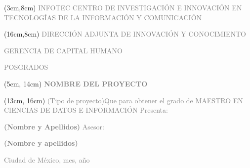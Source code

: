 \newpage{\ }
\thispagestyle{empty}

\begin{titlepage}

\begin{textblock*}{9.5cm}(3cm,8cm) %
	\renewcommand{\baselinestretch}{1}
   \flushright\normalsize\textcolor{gray}{INFOTEC CENTRO DE INVESTIGACIÓN E INNOVACIÓN EN TECNOLOGÍAS DE LA INFORMACIÓN Y COMUNICACIÓN}
\end{textblock*}

\begin{textblock*}{8cm}(16cm,8cm) %
	\renewcommand{\baselinestretch}{1}
	\flushleft\footnotesize\textcolor{gray}{DIRECCIÓN ADJUNTA DE INNOVACIÓN Y CONOCIMIENTO}\par
	\textcolor{gray}{GERENCIA DE CAPITAL HUMANO} \par
	\textcolor{gray}{POSGRADOS}
\end{textblock*}

\begin{textblock*}{8cm}(5cm, 14cm)
	\renewcommand{\baselinestretch}{1}
	\center\Huge\textcolor{gray}{\textbf{NOMBRE DEL PROYECTO}}
\end{textblock*}

\begin{textblock*}{10cm}(13cm, 16cm)
	\renewcommand{\baselinestretch}{1}
	\flushleft\normalsize\textcolor{gray}{(Tipo de proyecto)\newline Que para obtener el grado de MAESTRO EN CIENCIAS DE DATOS E INFORMACIÓN}
	\vspace{2em}
	\flushleft\normalsize\textcolor{gray}{Presenta:}\par
	\flushleft\normalsize\textcolor{gray}{\textbf{(Nombre y Apellidos)}}
	\flushleft\normalsize\textcolor{gray}{Asesor:}\par
	\flushleft\normalsize\textcolor{gray}{\textbf{(Nombre y apellidos)}}\par
	\vspace{8em}
	\flushleft\normalsize\textcolor{gray}{Ciudad de México, mes, año}\par
\end{textblock*}
\end{titlepage}
\newpage{\ }